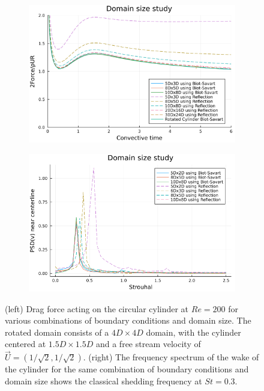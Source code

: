 \documentclass[preprint,12pt]{elsarticle}
\begin{document}
\begin{figure}
    \centering
    \begin{subfigure}{.5\textwidth}
        \centering
        \includegraphics[width=\textwidth]{tex//fig/force.png}
    \end{subfigure}%
    \begin{subfigure}{.5\textwidth}
        \centering
        \includegraphics[width=\textwidth]{tex/fig/fft.png}
    \end{subfigure}%
    \caption{(left) Drag force acting on the circular cylinder at $Re=200$ for various combinations of boundary conditions and domain size. The rotated domain consists of a $4D\times4D$ domain, with the cylinder centered at $1.5D\times1.5D$ and a free stream velocity of $\vec{U}=(1/\sqrt2,1/\sqrt2)$. (right) The frequency spectrum of the wake of the cylinder for the same combination of boundary conditions and domain size shows the classical shedding frequency at $St=0.3$.}
    \label{fig:cylinder_force}
\end{figure}
\end{document}
